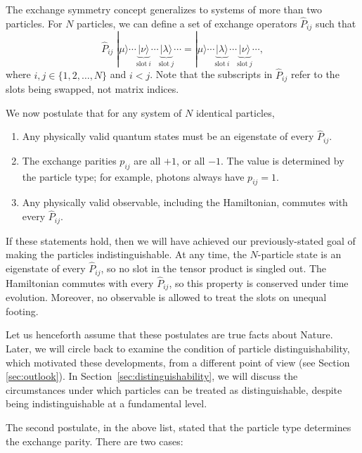 \documentclass[prx,12pt]{revtex4-2}
\begin{document}
The exchange symmetry concept generalizes to systems of more than two
particles.  For $N$ particles, we can define a set of exchange
operators $\hat{P}_{ij}$ such that
\begin{equation}
  \hat{P}_{ij} \; |\mu\rangle \cdots \underbrace{|\nu\rangle}_{\mathrm{slot}~i} \cdots \underbrace{|\lambda\rangle}_{\mathrm{slot}~j} \cdots
  = |\mu\rangle \cdots \underbrace{|\lambda\rangle}_{\mathrm{slot}~i} \cdots \underbrace{|\nu\rangle}_{\mathrm{slot}~j} \cdots,
\end{equation}
where $i,j\in\{1,2,\dots,N\}$ and $i < j$.  Note that the subscripts
in $\hat{P}_{ij}$ refer to the slots being swapped, not matrix
indices.

We now postulate that for any system of $N$ identical particles,
\begin{enumerate}
\item Any physically valid quantum states must be an eigenstate of
  every $\hat{P}_{ij}$.

\item The exchange parities $p_{ij}$ are all $+1$, or all $-1$.  The
  value is determined by the particle type; for example, photons
  always have $p_{ij} = 1$.

\item Any physically valid observable, including the Hamiltonian,
  commutes with every $\hat{P}_{ij}$.
\end{enumerate}

\noindent
If these statements hold, then we will have achieved our
previously-stated goal of making the particles indistinguishable.  At
any time, the $N$-particle state is an eigenstate of every
$\hat{P}_{ij}$, so no slot in the tensor product is singled out.  The
Hamiltonian commutes with every $\hat{P}_{ij}$, so this property is
conserved under time evolution.  Moreover, no observable is allowed to
treat the slots on unequal footing.

Let us henceforth assume that these postulates are true facts about
Nature.  Later, we will circle back to examine the condition of
particle distinguishability, which motivated these developments, from
a different point of view (see Section \ref{sec:outlook}).  In
Section~\ref{sec:distinguishability}, we will discuss the
circumstances under which particles can be treated as distinguishable,
despite being indistinguishable at a fundamental level.

The second postulate, in the above list, stated that the particle type
determines the exchange parity.  There are two cases:
\end{document}
